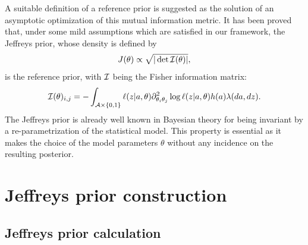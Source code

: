     A suitable definition of a reference prior is suggested  as the solution of an asymptotic optimization of this mutual information metric.
    It has been proved that, under some mild assumptions which are satisfied in our framework, the Jeffreys prior, whose density is defined by  
       \begin{equation}
        J(\theta)\propto\sqrt{|\det\mathcal{I}(\theta)|} ,
         \label{uncIM:eq:jeff}
    \end{equation}
    is the reference prior, with $\mathcal{I}$ being the Fisher information matrix:
    \begin{equation}
        \mathcal{I}(\theta)_{i,j}
            = -\int_{\mathcal{A} \times \{0,1\}} \ell(z|a,\theta)\partial^2_{\theta_i\theta_j} \log \ell(z|a,\theta)h(a) \lambda(da,dz).
    \end{equation}
    The Jeffreys prior is already well known in Bayesian theory for being invariant by a re-parametrization of the statistical model.
    This property is essential as it makes the choice of the model parameters $\theta$ without any incidence on the resulting posterior.
    
\section{Jeffreys prior construction}  \label{uncIM:sec:construction}

    \subsection{Jeffreys prior calculation} \label{uncIM:sec:jeffcalc}
    
